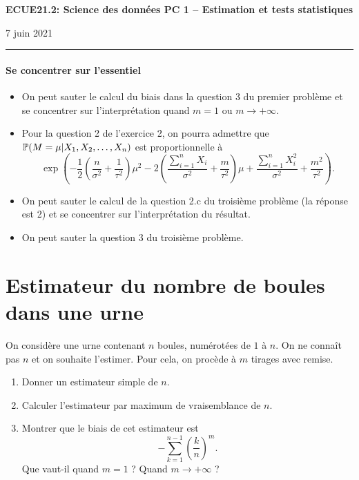\documentclass[french,11pt]{article}
\begin{document}
\begin{center}
\bf\large ECUE21.2: Science des données \hfill
PC 1 -- Estimation et tests statistiques
\end{center}

\noindent
\hfill 7 juin 2021

\noindent
\rule{\textwidth}{.4pt}

\medskip

\paragraph{Se concentrer sur l'essentiel}
\begin{itemize}
\item On peut sauter le calcul du biais dans la question 3 du premier problème
  et se concentrer sur l'interprétation quand $m = 1$ ou
  $m \rightarrow +\infty.$
\item Pour la question 2 de l'exercice 2, on pourra admettre que
  $\mathbb{P}(M=\mu | X_1, X_2, \dots, X_n)$ est proportionnelle à
\[
  \exp \left( -\frac12 \left( \frac{n}{\sigma^2} + \frac1{\tau^2}\right) \mu^2 - 
    2 \left(\frac{\sum_{i=1}^n X_i}{\sigma^2} + \frac{m}{\tau^2} \right) \mu +  
    \frac{\sum_{i=1}^n X_i^2}{\sigma^2} + \frac{m^2}{\tau^2} \right).
\]
\item On peut sauter le calcul de la question 2.c du troisième problème (la
  réponse est 2) et se concentrer sur l'interprétation du résultat.
\item On peut sauter la question 3 du troisième problème.
\end{itemize}

\section{Estimateur du nombre de boules dans une urne}

On considère une urne contenant $n$ boules, numérotées de $1$ à $n$. On ne
connaît pas $n$ et on souhaite l'estimer. Pour cela, on procède à $m$ tirages
avec remise.
\begin{enumerate}
\item Donner un estimateur simple de $n.$
\item Calculer l'estimateur par maximum de vraisemblance de $n.$
\item Montrer que le biais de cet estimateur est 
  \[
    - \sum_{k=1}^{n-1} \left( \frac{k}{n} \right)^m.
  \]
  Que vaut-il quand $m=1$ ? Quand $m  \rightarrow +\infty$ ? 
\end{enumerate}
\end{document}
